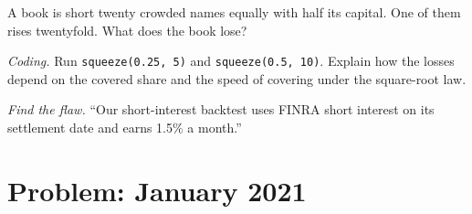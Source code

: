 \begin{exercise}[$\star\star$]\label{exo:s1:short-interest-borrow-and-crowding:6}
A book is short twenty crowded names equally with half its capital. One of them rises twentyfold. What does the book lose?
\end{exercise}

\begin{exercise}[$\star\star\star$]\label{exo:s1:short-interest-borrow-and-crowding:7}
\emph{Coding.} Run \texttt{squeeze(0.25, 5)} and \texttt{squeeze(0.5, 10)}. Explain how the losses depend on the covered share and the speed of covering
under the square-root law.
\end{exercise}

\begin{exercise}[$\star\star\star$]\label{exo:s1:short-interest-borrow-and-crowding:8}
\emph{Find the flaw.} ``Our short-interest backtest uses FINRA short interest on its settlement date and earns 1.5\% a month.''
\end{exercise}

\section{Problem: January 2021}

